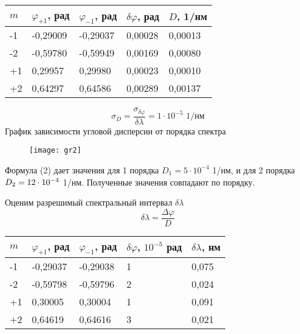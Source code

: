 	\begin{table}[H]
		\centering
		\begin{tabular}{|l|l|l|l|l|}
			\hline
			$m$ & $\varphi_{+1}$, рад & $\varphi_{-1}$, рад & $\delta\varphi$, рад & $D$, 1/нм \\ \hline
			-1  & -0,29009            & -0,29037            & 0,00028              & 0,00013   \\ \hline
			-2  & -0,59780            & -0,59949            & 0,00169              & 0,00080   \\ \hline
			+1  & 0,29957             & 0,29980             & 0,00023              & 0,00010   \\ \hline
			+2  & 0,64297             & 0,64586             & 0,00289              & 0,00137   \\ \hline
		\end{tabular}
	\end{table}
	\[
		\sigma_D = \frac{\sigma_{\delta\varphi}}{\delta\lambda} = 1\cdot 10^{-5} \text{ 1/нм}
	\]
	График зависимости угловой дисперсии от порядка спектра
	\begin{figure}[H]
		\centering
		\texttt{[image: gr2]}
	\end{figure}

	Формула (2) дает значения для 1 порядка $D_1 = 5 \cdot 10^{-4}$ 1/нм, и для 2 порядка $D_2 \hm= 12 \cdot 10^{-4}$ 1/нм. Полученные значения совпадают по порядку.
	
	Оценим разрешимый спектральный интервал $\delta\lambda$
	\[
		\delta\lambda = \frac{\Delta\varphi}{D}
	\]
	\begin{table}[H]
		\centering
		\begin{tabular}{|l|l|l|l|l|}
			\hline
			$m$ & $\varphi_{+1}$, рад & $\varphi_{-1}$, рад & $\delta\varphi$, $10^{-5}$ рад & $\delta\lambda$, нм \\ \hline
			-1  & -0,29037            & -0,29038            & 1                              & 0,075               \\ \hline
			-2  & -0,59798            & -0,59796            & 2                              & 0,024               \\ \hline
			+1  & 0,30005             & 0,30004             & 1                              & 0,091               \\ \hline
			+2  & 0,64619             & 0,64616             & 3                              & 0,021               \\ \hline
		\end{tabular}
	\end{table}


